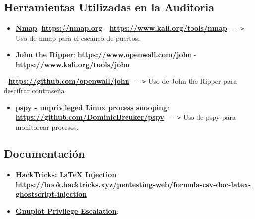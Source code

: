 \documentclass[a4paper]{article} %
\begin{document}
    \subsection{Herramientas Utilizadas en la Auditoria}

    \begin{itemize}
        \item \href{https://nmap.org}{\textbf{\color{black}Nmap}}: \href{https://nmap.org}{\textbf{\color{blue}https://nmap.org}} - \href{https://www.kali.org/tools/nmap}{\textbf{\color{blue}https://www.kali.org/tools/nmap}} \texttt{{-}{-}{-}>} Uso de nmap para el escaneo de puertos.
        \item \href{https://www.openwall.com/john}{\textbf{\color{black}John the Ripper}}: \href{https://www.openwall.com/john}{\textbf{\color{blue}https://www.openwall.com/john}} - \href{https://www.kali.org/tools/john}{\textbf{\color{blue}https://www.kali.org/tools/john}}
    \end{itemize}
    \hspace{1cm} - \href{https://github.com/openwall/john}{\textbf{\color{blue}https://github.com/openwall/john}} \texttt{{-}{-}{-}>} Uso de John the Ripper para descifrar contraseña.
    \begin{itemize}
        \item \href{https://github.com/DominicBreuker/pspy}{\textbf{\color{black}pspy - unprivileged Linux process snooping}}: \href{https://github.com/DominicBreuker/pspy}{\textbf{\color{blue}https://github.com/DominicBreuker/pspy}} \texttt{{-}{-}{-}>} Uso de pspy para monitorear procesos.
    \end{itemize}
        
    \subsection{Documentación}

    \begin{itemize}
        \item \href{https://book.hacktricks.xyz/pentesting-web/formula-csv-doc-latex-ghostscript-injection}{\textbf{\color{black}HackTricks: LaTeX Injection}} \href{https://book.hacktricks.xyz/pentesting-web/formula-csv-doc-latex-ghostscript-injection}{\textbf{\color{blue}https://book.hacktricks.xyz/pentesting-web/formula-csv-doc-latex-ghostscript-injection}}
        \item \href{https://exploit-notes.hdks.org/exploit/linux/privilege-escalation/gnuplot-privilege-escalation}{\textbf{\color{black}Gnuplot Privilege Escalation}}:
    \end{itemize}
\end{document}
